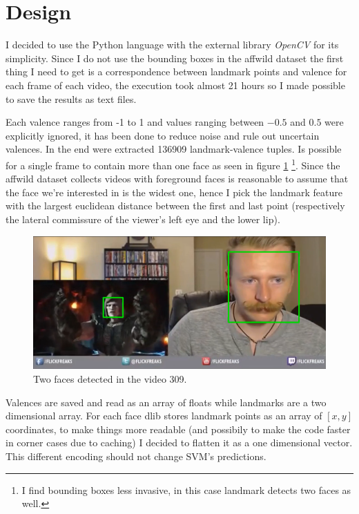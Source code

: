 \section{Design}
I decided to use the Python language with the external library \textit{OpenCV} for its simplicity.
Since I do not use the bounding boxes in the affwild dataset the first thing I need to get is a correspondence between landmark points and valence for each frame of each video, the execution took almost 21 hours so I made possible to save the results as text files.

Each valence ranges from -1 to 1 and values ranging between $-0.5$  and $0.5$ were explicitly ignored, it has been done to reduce noise and rule out uncertain valences.
In the end were extracted 136909 landmark-valence tuples.
Is possible for a single frame to contain more than one face as seen in figure \ref{fig:double_face} \footnote{I find bounding boxes less invasive, in this case landmark detects two faces as well.}.
Since the affwild dataset collects videos with foreground faces is reasonable to assume that the face we're interested in is the widest one, hence I pick the landmark feature with the largest euclidean distance between the first and last point (respectively the lateral commissure of the viewer's left eye and the lower lip).

\begin{figure}[h!t]
    \centering
    \includegraphics[scale=0.4]{images/309mp4_double_face.png}
    \caption{Two faces detected in the video 309.}
    \label{fig:double_face}
\end{figure}

Valences are saved and read as an array of floats while landmarks are a two dimensional array. 
For each face dlib stores landmark points as an array of $[x,y]$ coordinates, to make things more readable (and possibily to make the code faster in corner cases due to caching) I decided to flatten it as a one dimensional vector.
This different encoding should not change SVM's predictions.

